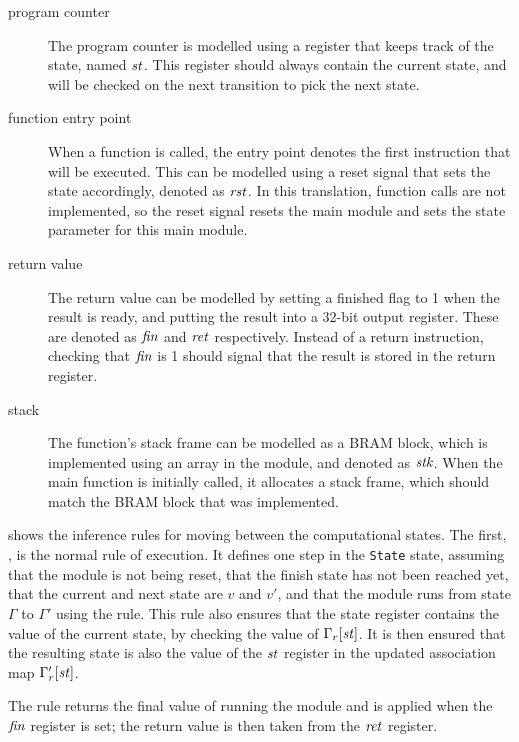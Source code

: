 \begin{description}
\item[program counter] The program counter is modelled using a register that
  keeps track of the state, named $\mathit{st}$.  This register should always
  contain the current state, and will be checked on the next transition to pick
  the next state.
\item[function entry point] When a function is called, the entry point denotes
  the first instruction that will be executed. This can be modelled using a
  reset signal that sets the state accordingly, denoted as $\mathit{rst}$.  In
  this translation, function calls are not implemented, so the reset signal
  resets the main module and sets the state parameter for this main module.
\item[return value] The return value can be modelled by setting a finished flag
  to 1 when the result is ready, and putting the result into a 32-bit output
  register. These are denoted as $\mathit{fin}$ and $\mathit{ret}$ respectively.
  Instead of a return instruction, checking that $\mathit{fin}$ is 1 should
  signal that the result is stored in the return register.
\item[stack] The function's stack frame can be modelled as a \gls{BRAM} block, which is
  implemented using an array in the module, and denoted as $\mathit{stk}$.
  When the main function is initially called, it allocates a stack frame, which
  should match the \gls{BRAM} block that was implemented.
\end{description}

 shows the inference rules for moving between the
computational states.  The first, , is the normal rule
of execution.  It defines one step in the \texttt{State} state, assuming that
the module is not being reset, that the finish state has not been reached yet,
that the current and next state are $v$ and $v'$, and that the module runs from
state $\Gamma$ to $\Gamma'$ using the  rule.  This rule
also ensures that the state register contains the value of the current state, by
checking the value of $\Gamma_r[\mathit{st}]$.  It is then ensured that the resulting
state is also the value of the $\mathit{st}$ register in the updated association map
$\Gamma'_r[\mathit{st}]$.

The  rule returns the final value of running the
module and is applied when the $\mathit{fin}$ register is set; the return value
is then taken from the $\mathit{ret}$ register.

